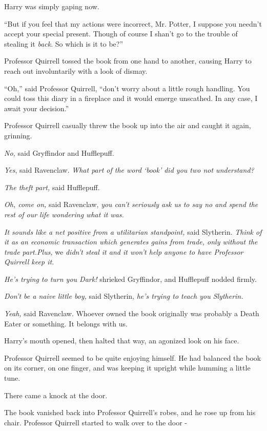 Harry was simply gaping now.

``But if you feel that my actions were incorrect, Mr. Potter, I suppose
you needn't accept your special present. Though of course I shan't go to
the trouble of stealing it \emph{back}. So which is it to be?''

Professor Quirrell tossed the book from one hand to another, causing
Harry to reach out involuntarily with a look of dismay.

``Oh,'' said Professor Quirrell, ``don't worry about a little rough
handling. You could toss this diary in a fireplace and it would emerge
unscathed. In any case, I await your decision.''

Professor Quirrell casually threw the book up into the air and caught it
again, grinning.

\emph{No,} said Gryffindor and Hufflepuff.

\emph{Yes}, said Ravenclaw. \emph{What part of the word `book' did you
two not understand?}

\emph{The theft part,} said Hufflepuff.

\emph{Oh, come on,} said Ravenclaw, \emph{you can't seriously ask us to
say no and spend the rest of our life wondering what it was.}

\emph{It sounds like a net positive from a utilitarian standpoint,} said
Slytherin. \emph{Think of it as an economic transaction which generates
gains from trade, only without the trade part.}\emph{Plus,} we
\emph{didn't steal it and it won't help anyone to have Professor
Quirrell keep it.}

\emph{He's trying to turn you Dark!} shrieked Gryffindor, and Hufflepuff
nodded firmly.

\emph{Don't be a naive little boy,} said Slytherin, \emph{he's trying to
teach you Slytherin.}

\emph{Yeah,} said Ravenclaw. Whoever owned the book originally was
probably a Death Eater or something. It belongs with us.

Harry's mouth opened, then halted that way, an agonized look on his
face.

Professor Quirrell seemed to be quite enjoying himself. He had balanced
the book on its corner, on one finger, and was keeping it upright while
humming a little tune.

There came a knock at the door.

The book vanished back into Professor Quirrell's robes, and he rose up
from his chair. Professor Quirrell started to walk over to the door -

